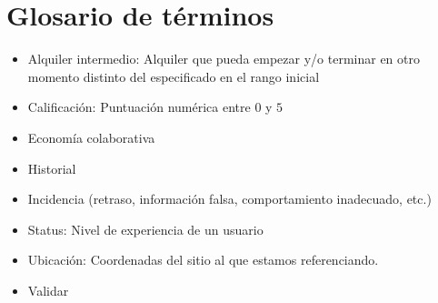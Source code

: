 \documentclass[11pt,spanish]{article} %
\begin{document}
\section{Glosario de términos}
\begin{itemize}
	\item Alquiler intermedio: Alquiler que pueda empezar y/o terminar en otro momento distinto del especificado en el rango inicial
	\item Calificación: Puntuación numérica entre $0$ y $5$
	\item Economía colaborativa
	\item Historial
	\item Incidencia (retraso, información falsa, comportamiento inadecuado, etc.)
	\item Status: Nivel de experiencia de un usuario
	\item Ubicación: Coordenadas del sitio al que estamos referenciando.
	\item Validar	
\end{itemize}







  

  
\end{document}
